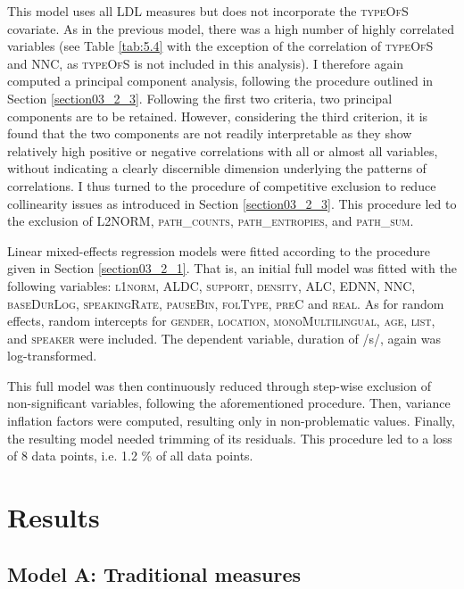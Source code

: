 This model uses all LDL measures but does not incorporate the \textsc{typeOfS} covariate. As in the previous model, there was a high number of highly correlated variables (see Table \ref{tab:5.4} with the exception of the correlation of \textsc{typeOfS} and \textsc{NNC}, as \textsc{typeOfS} is not included in this analysis). I therefore again computed a principal component analysis, following the procedure outlined in Section \ref{section03_2_3}. Following the first two criteria, two principal components are to be retained. However, considering the third criterion, it is found that the two components are not readily interpretable as they show relatively high positive or negative correlations with all or almost all variables, without indicating a clearly discernible dimension underlying the patterns of correlations. I thus turned to the procedure of competitive exclusion to reduce collinearity issues as introduced in Section \ref{section03_2_3}. This procedure led to the exclusion of L2NORM, \textsc{path\_counts}, \textsc{path\_entropies}, and \textsc{path\_sum}.

Linear mixed-effects regression models were fitted according to the procedure given in Section \ref{section03_2_1}. That is, an initial full model was fitted with the following variables: \textsc{l1norm}, \textsc{ALDC}, \textsc{support}, \textsc{density}, \textsc{ALC}, \textsc{EDNN}, \textsc{NNC}, \textsc{baseDurLog}, \textsc{speakingRate}, \textsc{pauseBin}, \textsc{folType}, \textsc{preC} and \textsc{real}. As for random effects, random intercepts for \textsc{gender}, \textsc{location}, \textsc{monoMultilingual}, \textsc{age}, \textsc{list}, and \textsc{speaker} were included. The dependent variable, duration of /s/, again was log-transformed.

This full model was then continuously reduced through step-wise exclusion of non-significant variables, following the aforementioned procedure. Then, variance inflation factors were computed, resulting only in non-problematic values. Finally, the resulting model needed trimming of its residuals. This procedure led to a loss of 8 data points, i.e. 1.2 \% of all data points.

\section{Results}\label{section05_3}

\subsection{Model A: Traditional measures}\label{section05_3_1}

